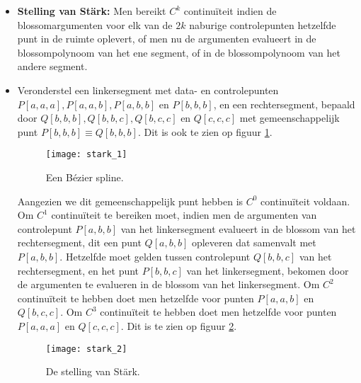 \begin{itemize}
{	}
	{
		\begin{itemize} 
		\item \textbf{Stelling van Stärk:} Men bereikt $C^k$ continuïteit indien de blossomargumenten voor elk van de $2k$ naburige controlepunten hetzelfde punt in de ruimte oplevert, of men nu de argumenten evalueert in de blossompolynoom van het ene segment, of in de blossompolynoom van het andere segment. 
		\item Veronderstel een linkersegment met data- en controlepunten $P[a, a, a], P[a, a, b], P[a, b, b]$ en $P[b, b, b]$, en een rechtersegment, bepaald door $Q[b, b, b], Q[b, b, c], Q[b, c, c]$ en $Q[c, c, c]$ met gemeenschappelijk punt $P[b, b, b] \equiv Q[b, b, b]$. Dit is ook te zien op figuur \ref{fig:stark_1}.
		\begin{figure}[ht]
			\centering
			\texttt{[image: stark\_1]}
			\caption{Een Bézier spline.}
			\label{fig:stark_1}
		\end{figure}
		
		Aangezien we dit gemeenschappelijk punt hebben is $C^0$ continuïteit voldaan. Om $C^1$ continuïteit te bereiken moet, indien men de argumenten van controlepunt $P[a, b, b]$ van het linkersegment evalueert in de blossom van het rechtersegment, dit een punt $Q[a, b, b]$ opleveren dat samenvalt met $P[a, b, b]$. Hetzelfde moet gelden tussen controlepunt $Q[b,b,c]$ van het rechtersegment, en het punt $P[b,b,c]$ van het linkersegment, bekomen door de argumenten te evalueren in de blossom van het linkersegment. Om $C^2$ continuïteit te hebben doet men hetzelfde voor punten $P[a,a,b]$ en $Q[b,c,c]$. Om $C^3$ continuïteit te hebben doet men hetzelfde voor punten $P[a,a,a]$ en $Q[c,c,c]$. Dit is te zien op figuur \ref{fig:stark_2}.

		\begin{figure}[ht]
			\centering
			\texttt{[image: stark\_2]}
			\caption{De stelling van Stärk.}
			\label{fig:stark_2}
		\end{figure}
			

\end{itemize}}
\end{itemize}
